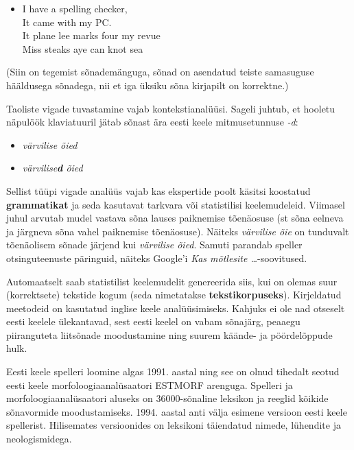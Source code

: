 \begin{multicols}{2}
\begin{itemize}
\item[]  I have a spelling checker,\\
  It came with my PC.\\
  It plane lee marks four my revue\\
  Miss steaks aye can knot sea 
\end{itemize}

(Siin on tegemist sõnademänguga, sõnad on asendatud teiste samasuguse hääldusega sõnadega, nii et iga üksiku sõna kirjapilt on korrektne.)

Taoliste vigade tuvastamine vajab kontekstianalüüsi. 
Sageli juhtub, et hooletu näpulöök klaviatuuril jätab sõnast ära eesti keele mitmusetunnuse \textit{-d}: 

\begin{itemize}
\item[] \textit{värvilise õied}
\item[] \textit{värvilise\textbf{d} õied}
\end{itemize}

Sellist tüüpi vigade analüüs vajab kas ekspertide poolt käsitsi koostatud \textbf{grammatikat} ja seda kasutavat tarkvara või statistilisi keelemudeleid.  Viimasel juhul arvutab mudel vastava sõna lauses paiknemise tõenäosuse (st sõna eelneva ja järgneva sõna vahel paiknemise tõenäosuse).  Näiteks \textit{värvilise õie} on tunduvalt tõenäolisem sõnade järjend kui \textit{värvilise õied}.  Samuti parandab speller otsinguteenuste päringuid, näiteks Google’i \textit{Kas mõtlesite …}-soovitused.

Automaatselt saab statistilist keelemudelit genereerida siis, kui on olemas suur (korrektsete) tekstide kogum (seda nimetatakse \textbf{tekstikorpuseks}).  Kirjeldatud meetodeid on kasutatud inglise keele analüüsimiseks.  Kahjuks ei ole nad otseselt eesti keelele ülekantavad, sest eesti keelel on vabam sõnajärg, peaaegu piiranguteta liitsõnade moodustamine ning suurem käände- ja pöördelõppude hulk.



Eesti keele spelleri loomine algas 1991. aastal ning see on olnud tihedalt seotud eesti keele morfoloogiaanalüsaatori ESTMORF arenguga. 
Spelleri ja morfoloogiaanalüsaatori aluseks on 36000-sõnaline leksikon ja reeglid kõikide sõnavormide moodustamiseks. 
1994. aastal anti välja esimene versioon eesti keele spellerist. Hilisemates versioonides on leksikoni täiendatud nimede, lühendite ja neologismidega.


\end{multicols}
